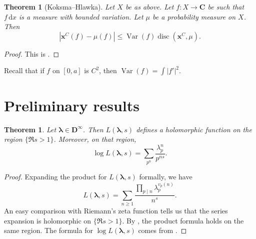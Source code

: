 \documentclass{article}
\DeclareMathOperator{\disc}{disc}
\DeclareMathOperator{\Var}{Var}
\newcommand{\bC}{\mathbf{C}}
\newcommand{\bD}{\mathbf{D}}
\newcommand{\blambda}{{\boldsymbol{\lambda}}}
\newcommand{\bx}{\boldsymbol{x}}
\newcommand{\dd}{\mathrm{d}}
\newtheorem{theorem}[subsection]{Theorem}
\theoremstyle{definition}
\begin{document}
\begin{theorem}[Koksma--Hlawka]
Let $X$ be as above. Let $f\colon X\to \bC$ be such that $f\, \dd x$ is a 
measure with bounded variation. Let $\mu$ be a probability measure on $X$. Then 
\[
	|\bx^C(f) - \mu(f)| \leqslant \Var(f) \disc(\bx^C,\mu) .
\]
\end{theorem}
\begin{proof}
This is \cite[Th.~3.2]{okten-1999}. 
\end{proof}

Recall that if $f$ on $[0,a]$ is $C^2$, then $\Var(f)=\int |f'|^2$. 





\section{Preliminary results}\label{sec:prelim-result}

\begin{theorem}
Let $\blambda\in \bD^\infty$. Then $L(\blambda,s)$ defines a holomorphic 
function on the region $\{\Re s>1\}$. Moreover, on that region, 
\[
	\log L(\blambda,s) = \sum_{p^n} \frac{\lambda_p^n}{p^{n s}} .
\]
\end{theorem}
\begin{proof}
Expanding the product for $L(\blambda,s)$ formally, we have 
\[
	L(\blambda,s) = \sum_{n\geqslant 1} \frac{\prod_{p\mid n} \lambda_p^{v_p(n)}}{n^s} .
\]
An easy comparison with Riemann's zeta function tells us that the series 
expansion is holomorphic on $\{\Re s>1\}$. By \cite[Th.~11.7]{apostol-1976}, 
the product formula holds on the same region. The formula for 
$\log L(\blambda,s)$ comes from \cite[11.9 Ex.~2]{apostol-1976}.
\end{proof}
\end{document}
